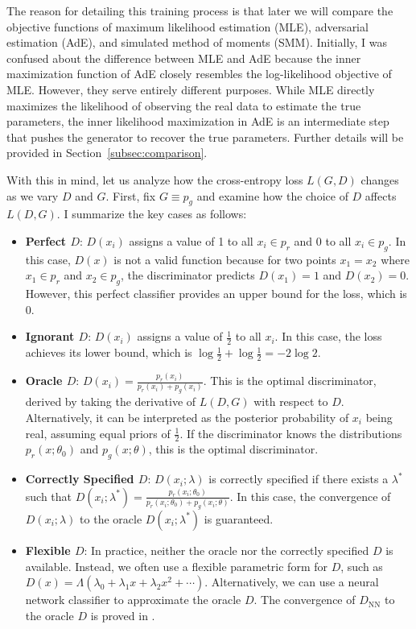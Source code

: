 \documentclass[12pt]{article}
\begin{document}
The reason for detailing this training process is that later we will compare
the objective functions of maximum likelihood estimation (MLE), adversarial
estimation (AdE), and simulated method of moments (SMM). Initially, I was
confused about the difference between MLE and AdE because the inner
maximization function of AdE closely resembles the log-likelihood objective of
MLE. However, they serve entirely different purposes. While MLE directly
maximizes the likelihood of observing the real data to estimate the true
parameters, the inner likelihood maximization in AdE is an intermediate step
that pushes the generator to recover the true parameters. Further details will
be provided in Section~\ref{subsec:comparison}.

With this in mind, let us analyze how the cross-entropy loss \(L(G, D)\)
changes as we vary \(D\) and \(G\). First, fix \(G \equiv p_g\) and examine how
the choice of \(D\) affects \(L(D, G)\). I summarize the key cases as follows:
\begin{itemize}
    \item \textbf{Perfect \(D\)}: \(D(x_i)\) assigns a value of 1 to all \(x_i \in p_r\) and 0 to all \(x_i \in p_g\). In this case, \(D(x)\) is not a valid function because for two points \(x_1 = x_2\) where \(x_1 \in p_r\) and \(x_2 \in p_g\), the discriminator predicts \(D(x_1) = 1\) and \(D(x_2) = 0\). However, this perfect classifier provides an upper bound for the loss, which is 0.
    \item \textbf{Ignorant \(D\)}: \(D(x_i)\) assigns a value of \(\frac{1}{2}\) to all \(x_i\). In this case, the loss achieves its lower bound, which is \(\log \frac{1}{2} + \log \frac{1}{2} = -2\log 2\).
    \item \textbf{Oracle \(D\)}: \(D(x_i) = \frac{p_r(x_i)}{p_r(x_i) + p_g(x_i)}\). This is the optimal discriminator, derived by taking the derivative of \(L(D, G)\) with respect to \(D\). Alternatively, it can be interpreted as the posterior probability of \(x_i\) being real, assuming equal priors of \(\frac{1}{2}\). If the discriminator knows the distributions \(p_r(x; \theta_0)\) and \(p_g(x; \theta)\), this is the optimal discriminator.
    \item \textbf{Correctly Specified \(D\)}: \(D(x_i; \lambda)\) is correctly specified if there exists a \(\lambda^*\) such that \(D(x_i; \lambda^*) = \frac{p_r(x_i; \theta_0)}{p_r(x_i; \theta_0) + p_g(x_i; \theta)}\). In this case, the convergence of \(D(x_i; \lambda)\) to the oracle \(D(x_i; \lambda^*)\) is guaranteed.
    \item \textbf{Flexible \(D\)}: In practice, neither the oracle nor the correctly specified \(D\) is available. Instead, we often use a flexible parametric form for \(D\), such as \(D(x) = \Lambda(\lambda_0 + \lambda_1 x + \lambda_2 x^2 + \cdots)\). Alternatively, we can use a neural network classifier to approximate the oracle \(D\). The convergence of \(D_\text{NN}\) to the oracle \(D\) is proved in \citet{}.
\end{itemize}
\end{document}
